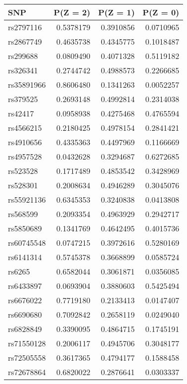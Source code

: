 \documentclass[
]{article}
\theoremstyle{plain}
\begin{document}
\begin{table}[H]
\begin{minipage}{0.5\linewidth}
  \end{minipage}
  \qquad
  \begin{minipage}{0.5\linewidth}
    \center
    \begin{table}[H]
\centering
\begin{tabular}{lrrr}
\toprule
SNP & P(Z = 2) & P(Z = 1) & P(Z = 0)\\
\midrule
rs2797116 & 0.5378179 & 0.3910856 & 0.0710965\\
rs2867749 & 0.4635738 & 0.4345775 & 0.1018487\\
rs299688 & 0.0809490 & 0.4071328 & 0.5119182\\
rs326341 & 0.2744742 & 0.4988573 & 0.2266685\\
rs35891966 & 0.8606480 & 0.1341263 & 0.0052257\\
\addlinespace
rs379525 & 0.2693148 & 0.4992814 & 0.2314038\\
rs42417 & 0.0958938 & 0.4275468 & 0.4765594\\
rs4566215 & 0.2180425 & 0.4978154 & 0.2841421\\
rs4910656 & 0.4335363 & 0.4497969 & 0.1166669\\
rs4957528 & 0.0432628 & 0.3294687 & 0.6272685\\
\addlinespace
rs523528 & 0.1717489 & 0.4853542 & 0.3428969\\
rs528301 & 0.2008634 & 0.4946289 & 0.3045076\\
rs55921136 & 0.6345353 & 0.3240838 & 0.0413808\\
rs568599 & 0.2093354 & 0.4963929 & 0.2942717\\
rs5850689 & 0.1341769 & 0.4642495 & 0.4015736\\
\addlinespace
rs60745548 & 0.0747215 & 0.3972616 & 0.5280169\\
rs6141314 & 0.5745378 & 0.3668899 & 0.0585724\\
rs6265 & 0.6582044 & 0.3061871 & 0.0356085\\
rs6433897 & 0.0693904 & 0.3880603 & 0.5425494\\
rs6676022 & 0.7719180 & 0.2133413 & 0.0147407\\
\addlinespace
rs6690680 & 0.7092842 & 0.2658119 & 0.0249040\\
rs6828849 & 0.3390095 & 0.4864715 & 0.1745191\\
rs71550128 & 0.2006117 & 0.4945706 & 0.3048177\\
rs72505558 & 0.3617365 & 0.4794177 & 0.1588458\\
rs72678864 & 0.6820022 & 0.2876641 & 0.0303337\\

\end{tabular}
\end{table}
\end{minipage}
\end{table}
\end{document}
